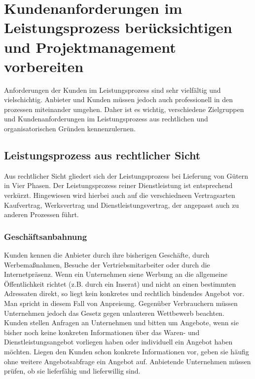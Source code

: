 \documentclass[a4paper, 12pt]{report}
\begin{document}
\newpage
\section{Kundenanforderungen im Leistungsprozess berücksichtigen und 
Projektmanagement vorbereiten}

Anforderungen der Kunden im Leistungsprozess sind sehr vielfältig und 
vielschichtig. Anbieter und Kunden müssen jedoch auch professionell in den 
prozessen miteinander umgehen. Daher ist es wichtig, verschiedene Zielgruppen 
und Kundenanforderungen im Leistungsprozess aus rechtlichen und 
organisatorischen Gründen kennenzulernen. 

\subsection{Leistungsprozess aus rechtlicher Sicht}

Aus rechtlicher Sicht gliedert sich der Leistungsprozess bei Lieferung von 
Gütern in Vier Phasen. Der Leistungsprozess reiner Dienstleistung ist 
entsprechend verkürzt. Hingewiesen wird hierbei auch auf die verschiedneen 
Vertragsarten Kaufvertrag, Werksvertrag und Dienstleistungsvertrag, der 
angepasst auch zu anderen Prozessen führt. \\

\subsubsection{Geschäftsanbahnung}

Kunden kennen die Anbieter durch ihre bisherigen Geschäfte, durch 
Werbemaßnahmen, Besuche der Vertriebsmitarbeiter oder durch die Internetpräsenz. 
Wenn ein Unternehmen siene Werbung an die allgemeine Öffentlichkeit richtet 
(z.B. durch ein Inserat) und nicht an einen bestimmten Adressaten direkt, so 
liegt kein konkretes und rechtlich bindendes Angebot vor. Man spricht in diesem 
Fall von Anpreisung. Gegenüber Verbrauchern müssen Unternehmen jedoch das Gesetz
gegen unlauteren Wettbewerb beachten. \\

Kunden stellen Anfragen an Unternehmen und bitten um Angebote, wenn sie bisher 
noch keine konkreten Informationen über das Waren- und Dienstleistungsangebot 
vorliegen haben oder individuell ein Angebot haben möchten. Liegen den Kunden 
schon konkrete Informationen vor, geben sie häufig ohne weitere Angebotsabfrage 
ein Angebot auf. Anbietende Unternehmen müssen prüfen, ob sie lieferfähig und 
lieferwillig sind. 
\end{document}

